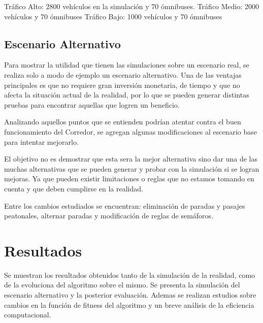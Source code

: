 Tráfico Alto:  2800 vehículos en la simulación y 70 ómnibuses. \newline
Tráfico Medio: 2000 vehículos y 70 ómnibuses \newline
Tráfico Bajo:  1000 vehículos y 70 ómnibuses
 




\subsection{Escenario Alternativo}

Para mostrar la utilidad que tienen las simulaciones sobre un escenario real, se realiza solo a modo de ejemplo un escenario alternativo. Una de las ventajas principales es que no requiere gran inversión monetaria, de tiempo y que no afecta la situación actual de la realidad, por lo que se pueden generar distintas pruebas para encontrar aquellas que logren un beneficio.

Analizando aquellos puntos que se entienden podrían atentar contra el buen funcionamiento del Corredor, se agregan algunas modificaciones al escenario base para intentar mejorarlo. 

El objetivo no es demostrar que esta sera la mejor alternativa sino dar una de las muchas alternativas que se pueden generar y probar con la simulación si se logran mejoras. Ya que pueden existir limitaciones o reglas que no estamos tomando en cuenta y que deben cumplirse en la realidad.

Entre los cambios estudiados se encuentran: eliminación de paradas y pasajes peatonales, alternar paradas y modificación de reglas de semáforos.



\section{Resultados}
Se muestran los resultados obtenidos tanto de la simulación de la realidad, como de la evoluciona del algoritmo sobre el mismo. Se presenta la simulación del escenario alternativo y la posterior evaluación. Ademas se realizan estudios sobre cambios en la función de fitness del algoritmo y un breve análisis de la eficiencia computacional.



